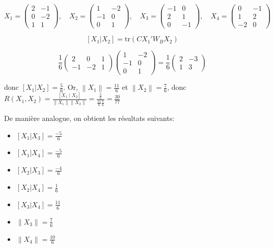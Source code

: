 \documentclass[
]{article}
\providecommand{\tightlist}{%
  \setlength{\itemsep}{0pt}\setlength{\parskip}{0pt}}
\begin{document}
\[
X_1 = \begin{pmatrix}
2 & -1 \\
0 & -2 \\
1 & 1 
\end{pmatrix}, \quad
X_2 = \begin{pmatrix}
1 & -2 \\
-1 & 0 \\
0 & 1 
\end{pmatrix}, \quad
X_3 = \begin{pmatrix}
-1 & 0 \\
2 & 1 \\
0 & -1 
\end{pmatrix}, \quad
X_4 = \begin{pmatrix}
0 & -1 \\
1 & 2 \\
-2 & 0 
\end{pmatrix}
\]

\[ [X_1|X_2] = \text{tr}(C X_1'W_B X_2) \]

\[ \frac{1}{6} \begin{pmatrix}
2 & 0 & 1 \\
-1 & -2 & 1
\end{pmatrix} \begin{pmatrix}
1 & -2 \\
-1 & 0 \\
0 & 1 
\end{pmatrix} = \frac{1}{6} \begin{pmatrix}
2 & -3 \\
1 & 3
\end{pmatrix}
\]

donc \([X_1|X_2] = \frac{5}{6}\). Or,
\(\left\| X_1 \right\| = \frac{11}{6}\) et
\(\left\| X_2 \right\| = \frac{7}{6}\), donc
\(R(X_1 ,X_2) = \frac{[ X_1 \mid X_2]}{\left\| X_1 \right\| \left\| X_2 \right\| } = \frac{ \frac{5}{6} }{ \frac{11}{6} \frac{7}{6} } = \frac{30}{77}\)

De manière analogue, on obtient les résultats suivants:

\begin{itemize}
\tightlist
\item
  \([X_1|X_3] = \frac{-5}{6}\)
\item
  \([X_1|X_4] = \frac{-5}{6}\)
\item
  \([X_2|X_3] = \frac{-4}{6}\)
\item
  \([X_2|X_4] = \frac{1}{6}\)
\item
  \([X_3|X_4] = \frac{11}{6}\)
\item
  \(\left\| X_3 \right\| = \frac{7}{6}\)
\item
  \(\left\| X_4 \right\| = \frac{10}{6}\)
\end{itemize}
\end{document}
